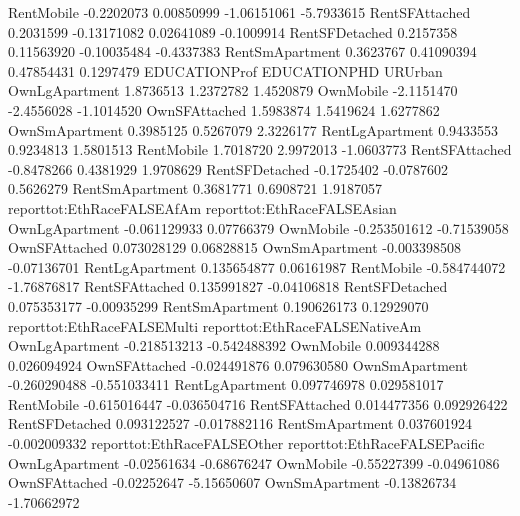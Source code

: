 \documentclass{article}
\begin{document}
\begin{Schunk}
\begin{Soutput}
RentMobile            -0.2202073  0.00850999 -1.06151061  -5.7933615
RentSFAttached         0.2031599 -0.13171082  0.02641089  -0.1009914
RentSFDetached         0.2157358  0.11563920 -0.10035484  -0.4337383
RentSmApartment        0.3623767  0.41090394  0.47854431   0.1297479
                EDUCATIONProf EDUCATIONPHD    URUrban
OwnLgApartment      1.8736513    1.2372782  1.4520879
OwnMobile          -2.1151470   -2.4556028 -1.1014520
OwnSFAttached       1.5983874    1.5419624  1.6277862
OwnSmApartment      0.3985125    0.5267079  2.3226177
RentLgApartment     0.9433553    0.9234813  1.5801513
RentMobile          1.7018720    2.9972013 -1.0603773
RentSFAttached     -0.8478266    0.4381929  1.9708629
RentSFDetached     -0.1725402   -0.0787602  0.5626279
RentSmApartment     0.3681771    0.6908721  1.9187057
                reporttot:EthRaceFALSEAfAm reporttot:EthRaceFALSEAsian
OwnLgApartment                -0.061129933                  0.07766379
OwnMobile                     -0.253501612                 -0.71539058
OwnSFAttached                  0.073028129                  0.06828815
OwnSmApartment                -0.003398508                 -0.07136701
RentLgApartment                0.135654877                  0.06161987
RentMobile                    -0.584744072                 -1.76876817
RentSFAttached                 0.135991827                 -0.04106818
RentSFDetached                 0.075353177                 -0.00935299
RentSmApartment                0.190626173                  0.12929070
                reporttot:EthRaceFALSEMulti reporttot:EthRaceFALSENativeAm
OwnLgApartment                 -0.218513213                   -0.542488392
OwnMobile                       0.009344288                    0.026094924
OwnSFAttached                  -0.024491876                    0.079630580
OwnSmApartment                 -0.260290488                   -0.551033411
RentLgApartment                 0.097746978                    0.029581017
RentMobile                     -0.615016447                   -0.036504716
RentSFAttached                  0.014477356                    0.092926422
RentSFDetached                  0.093122527                   -0.017882116
RentSmApartment                 0.037601924                   -0.002009332
                reporttot:EthRaceFALSEOther reporttot:EthRaceFALSEPacific
OwnLgApartment                  -0.02561634                   -0.68676247
OwnMobile                       -0.55227399                   -0.04961086
OwnSFAttached                   -0.02252647                   -5.15650607
OwnSmApartment                  -0.13826734                   -1.70662972

\end{Soutput}
\end{Schunk}
\end{document}
